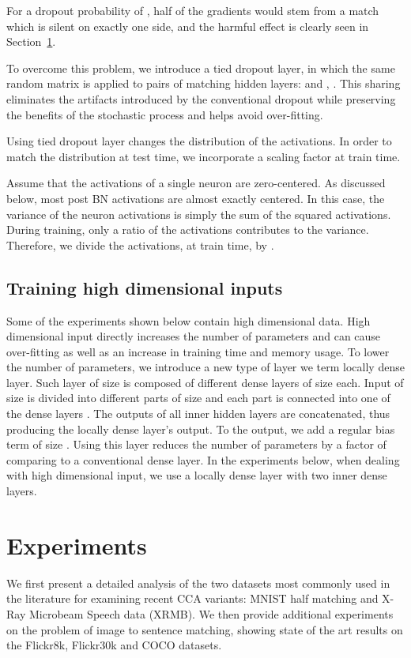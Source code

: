 \documentclass[10pt,twocolumn,letterpaper]{article}
\begin{document}
For a dropout probability of , half of the gradients would stem from a match which is silent on exactly one side, and the harmful effect is clearly seen in Section~\ref{sec:exp}.

To overcome this problem, we introduce a tied dropout layer, in which the same random matrix  is applied to pairs of matching hidden layers:  and , . This sharing eliminates the artifacts introduced by the conventional dropout while preserving the benefits of the stochastic process and helps avoid over-fitting. 

Using tied dropout layer changes the distribution of the activations. In order to match the distribution at test time, we incorporate a scaling factor at train time. 

Assume that the activations of a single neuron are zero-centered. As discussed below, most post BN activations are almost exactly centered. In this case, the variance of the neuron activations is simply the sum of the squared activations. During training, only a ratio  of the activations contributes to the variance. Therefore, we divide the activations, at train time, by .

\subsection{Training high dimensional inputs}
Some of the experiments shown below contain high dimensional data. High dimensional input directly increases the number of parameters and can cause over-fitting as well as an increase in training time and memory usage. To lower the number of parameters, we introduce a new type of layer we term locally dense layer. Such layer of size  is composed of  different dense layers  of size  each. Input  of size  is divided into  different parts of size  and each part  is connected into one of the dense layers . The outputs of all inner hidden layers are concatenated, thus producing the locally dense layer's output. To the output, we add a regular bias term  of size .
Using this layer reduces the number of parameters by a factor of  comparing to a conventional dense layer. In the experiments below, when dealing with high dimensional input, we use a locally dense layer with two inner dense layers.

\section{Experiments}
\label{sec:exp}

We first present a detailed analysis of the two datasets most commonly used in the literature for examining recent CCA variants: MNIST half matching and X-Ray Microbeam Speech data (XRMB). We then provide additional experiments on the problem of image to sentence matching, showing state of the art results on the Flickr8k, Flickr30k and COCO datasets.
\end{document}
